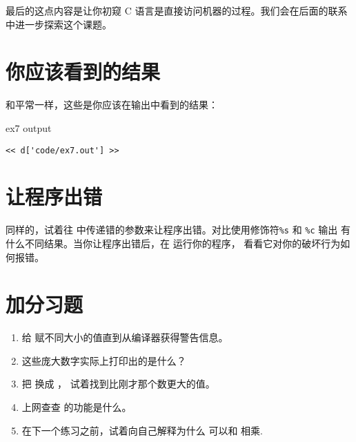 最后的这点内容是让你初窥 C 语言是直接访问机器的过程。我们会在后面的联系中进一步探索这个课题。

\section{你应该看到的结果}

和平常一样，这些是你应该在输出中看到的结果：

\begin{code}{ex7 output}
\begin{lstlisting}
<< d['code/ex7.out'] >>
\end{lstlisting}
\end{code}


\section{让程序出错}

同样的，试着往  中传递错的参数来让程序出错。对比使用修饰符\verb|%s| 和 \verb|%c| 输出  有什么不同结果。当你让程序出错后，在  运行你的程序， 看看它对你的破坏行为如何报错。

\section{加分习题}

\begin{enumerate}
\item 给  赋不同大小的值直到从编译器获得警告信息。
\item 这些庞大数字实际上打印出的是什么？
\item 把  换成 ， 试着找到比刚才那个数更大的值。
\item 上网查查  的功能是什么。
\item 在下一个练习之前，试着向自己解释为什么  可以和  相乘.
\end{enumerate}

